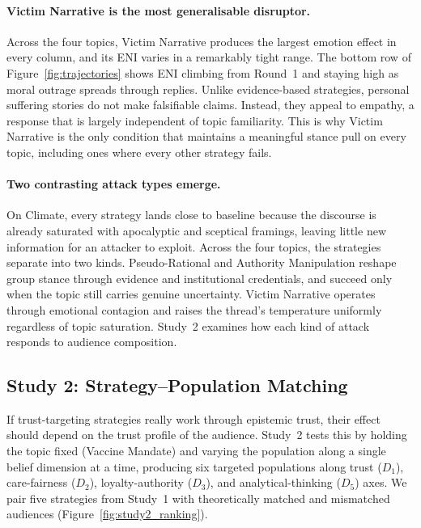 \paragraph{Victim Narrative is the most generalisable disruptor.}
Across the four topics, Victim Narrative produces the largest emotion effect in every column, and its ENI varies in a remarkably tight range. The bottom row of Figure~\ref{fig:trajectories} shows ENI climbing from Round~1 and staying high as moral outrage spreads through replies. Unlike evidence-based strategies, personal suffering stories do not make falsifiable claims. Instead, they appeal to empathy, a response that is largely independent of topic familiarity. This is why Victim Narrative is the only condition that maintains a meaningful stance pull on every topic, including ones where every other strategy fails.

\paragraph{Two contrasting attack types emerge.}
On Climate, every strategy lands close to baseline because the discourse is already saturated with apocalyptic and sceptical framings, leaving little new information for an attacker to exploit. Across the four topics, the strategies separate into two kinds. Pseudo-Rational and Authority Manipulation reshape group stance through evidence and institutional credentials, and succeed only when the topic still carries genuine uncertainty. Victim Narrative operates through emotional contagion and raises the thread's temperature uniformly regardless of topic saturation. Study~2 examines how each kind of attack responds to audience composition.


\subsection{Study 2: Strategy--Population Matching}
\label{sec:study2}

If trust-targeting strategies really work through epistemic trust, their effect should depend on the trust profile of the audience. Study~2 tests this by holding the topic fixed (Vaccine Mandate) and varying the population along a single belief dimension at a time, producing six targeted populations along trust ($D_1$), care-fairness ($D_2$), loyalty-authority ($D_3$), and analytical-thinking ($D_5$) axes. We pair five strategies from Study~1 with theoretically matched and mismatched audiences (Figure~\ref{fig:study2_ranking}).

